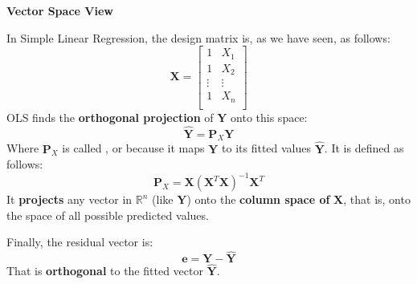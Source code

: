 \begin{flushleft}
    \textcolor{Green3}{ \textbf{Vector Space View}}
\end{flushleft}
In Simple Linear Regression, the design matrix is, as we have seen, as follows:
\begin{equation*}
    \mathbf{X} =
    \begin{bmatrix}
        1 & X_{1} \\
        1 & X_{2} \\
        \vdots & \vdots \\
        1 & X_{n} \\
    \end{bmatrix}
\end{equation*}
OLS finds the \textbf{orthogonal projection} of $\mathbf{Y}$ onto this space:
\begin{equation}
    \hat{\mathbf{Y}} = \mathbf{P}_X \mathbf{Y}
\end{equation}
Where $\mathbf{P}_X$ is called , or  because it maps $\mathbf{Y}$ to its fitted values $\hat{\mathbf{Y}}$. It is defined as follows:
\begin{equation}
    \mathbf{P}_X = \mathbf{X}\left(\mathbf{X}^{T} \mathbf{X}\right)^{-1} \mathbf{X}^{T}
\end{equation}
It \textbf{projects} any vector in $\mathbb{R}^{n}$ (like $\mathbf{Y}$) onto the \textbf{column space of} $\mathbf{X}$, that is, onto the space of all possible predicted values. 

\highspace
Finally, the residual vector is:
\begin{equation}
    \mathbf{e} = \mathbf{Y} - \hat{\mathbf{Y}}
\end{equation}
That is \textbf{orthogonal} to the fitted vector $\hat{\mathbf{Y}}$.
